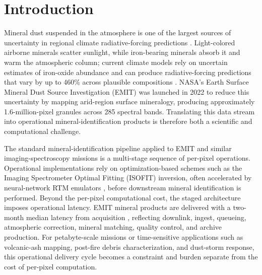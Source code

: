 \documentclass[11pt]{article}
\begin{document}
\section{Introduction}

Mineral dust suspended in the atmosphere is one of the largest sources of uncertainty in regional climate radiative-forcing predictions \cite{ipcc_2021}.
Light-colored airborne minerals scatter sunlight, while iron-bearing minerals absorb it and warm the atmospheric column; 
current climate models rely on uncertain estimates of iron-oxide abundance and can produce radiative-forcing predictions that vary by up to 460\% across plausible compositions \cite{emit_l1b_atbd}.
NASA's Earth Surface Mineral Dust Source Investigation (EMIT) was launched in 2022 to reduce this uncertainty by mapping arid-region surface mineralogy, producing approximately 1.6-million-pixel granules across 285 spectral bands.
Translating this data stream into operational mineral-identification products is therefore both a scientific and computational challenge.

The standard mineral-identification pipeline applied to EMIT and similar imaging-spectroscopy missions is a multi-stage sequence of per-pixel operations.
Operational implementations rely on optimization-based schemes such as the Imaging Spectrometer Optimal Fitting (ISOFIT) inversion, often accelerated by neural-network RTM emulators \cite{thompson2018, brodrick2021}, before downstream mineral identification is performed.
Beyond the per-pixel computational cost, the staged architecture imposes operational latency.
EMIT mineral products are delivered with a two-month median latency from acquisition \cite{emit_l2b_atbd}, reflecting downlink, ingest, queueing, atmospheric correction, mineral matching, quality control, and archive production.
For petabyte-scale missions or time-sensitive applications such as volcanic-ash mapping, post-fire debris characterization, and dust-storm response, this operational delivery cycle becomes a constraint and burden separate from the cost of per-pixel computation.
\end{document}
